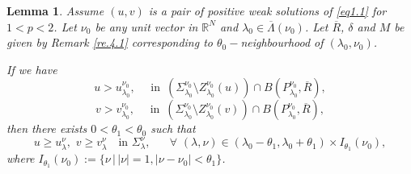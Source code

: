 \documentclass[12pt]{amsart}
\newtheorem{lem}[thm]{Lemma}
\theoremstyle{definition}
\theoremstyle{remark}
\theoremstyle{conclusion}
\theoremstyle{conjecture}
\numberwithin{equation}{section}
\newcommand{\R}{\mathbb{R}}
\begin{document}
\begin{lem}\label{lm.4.2}
Assume $(u,v)$ is a pair of positive weak solutions of \eqref{eq1.1} for $1<p<2$. Let $\nu_0$ be any unit vector in $\R^N$ and $\lambda_0\in\overline{\Lambda}(\nu_0)$. Let $\overline{R}$, $\delta$ and $M$ be given by Remark \ref{re.4.1} corresponding to $\theta_0-$neighbourhood of $(\lambda_0,\nu_0)$.

If we have
\begin{equation}\label{assump}
  u>u_{\lambda_0}^{\nu_0},\quad\,\,\mbox{in} \,\,\,(\Sigma_{\lambda_0}^{\nu_0}\setminus Z_{\lambda_0}^{\nu_0}(u))  \cap  B(P_{\lambda_0}^{\nu_0},\overline{R}),
\end{equation}
\begin{equation}\label{assump-}
  v>v_{\lambda_0}^{\nu_0},\quad\,\,\mbox{in} \,\,\,(\Sigma_{\lambda_0}^{\nu_0}\setminus Z_{\lambda_0}^{\nu_0}(v))  \cap  B(P_{\lambda_0}^{\nu_0},\overline{R}),
\end{equation}
then there exists $0<\theta_1 < \theta_0$ such that
$$ u\geq u^{\nu}_{\lambda},\,\,v\geq v^{\nu}_{\lambda} \quad \mbox{in}\,\, \Sigma_\lambda^\nu,\,\,\,\,\quad \forall\,\,(\lambda,\nu)\in (\lambda_0-\theta_1,\lambda_0+\theta_1)\times I_{\theta_1}(\nu_0),$$
where $I_{\theta_1}(\nu_0):=\{ \nu \,|\, |\nu|=1, |\nu-\nu_0|<\theta_1 \}$.
\end{lem}
\end{document}
